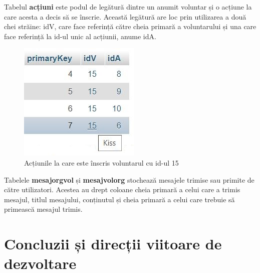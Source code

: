 \documentclass[12pt,a4paper]{report}
\begin{document}
\par
Tabelul \textbf{acțiuni} este podul de legătură dintre un anumit voluntar și o acțiune la care acesta a decis să se înscrie. Această legătură are loc prin utilizarea a două chei străine: idV, care face referință către cheia primară a voluntarului și una care face referință la id-ul unic al acțiunii, anume idA.
\\
\begin{figure}[H]
\centering
  \includegraphics[width=0.4\linewidth]{./imagini/actiuni.jpg}
  \caption{Acțiunile la care este înscris voluntarul cu id-ul 15}
\end{figure}

\par
Tabelele \textbf{mesajorgvol} și \textbf{mesajvolorg} stochează mesajele trimise sau primite de către utilizatori. Acestea au drept coloane cheia primară a celui care a trimis mesajul, titlul mesajului, conținutul și cheia primară a celui care trebuie să primească mesajul trimis.


\chapter{Concluzii și direcții viitoare de dezvoltare}
\end{document}
